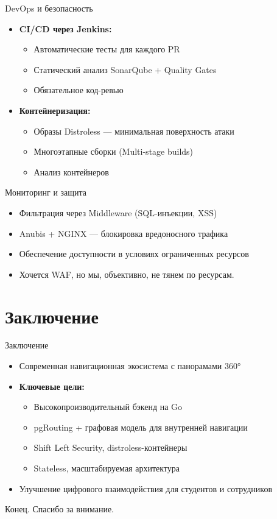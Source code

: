 \documentclass[10pt, aspectratio=169]{beamer}
\begin{document}
\begin{frame}{DevOps и безопасность}
	\begin{itemize}
		\item \textbf{CI/CD через Jenkins:}
		      \begin{itemize}
			      \item Автоматические тесты для каждого PR
			      \item Статический анализ SonarQube + Quality Gates
			      \item Обязательное код-ревью
		      \end{itemize}
		\item \textbf{Контейнеризация:}
		      \begin{itemize}
			      \item Образы Distroless --- минимальная поверхность атаки
			      \item Многоэтапные сборки (Multi-stage builds)
			      \item Анализ контейнеров
		      \end{itemize}
	\end{itemize}
\end{frame}

\begin{frame}{Мониторинг и защита}
	\begin{itemize}
		\item Фильтрация через Middleware (SQL-инъекции, XSS)
		\item Anubis + NGINX --- блокировка вредоносного трафика
		\item Обеспечение доступности в условиях ограниченных ресурсов
		\item Хочется WAF, но мы, объективно, не тянем по ресурсам.
	\end{itemize}
\end{frame}

\section*{Заключение}

\begin{frame}{Заключение}
	\begin{itemize}
		\item Современная навигационная экосистема с панорамами 360°
		\item \textbf{Ключевые цели:}
		      \begin{itemize}
			      \item Высокопроизводительный бэкенд на Go
			      \item pgRouting + графовая модель для внутренней навигации
			      \item Shift Left Security, distroless-контейнеры
			      \item Stateless, масштабируемая архитектура
		      \end{itemize}
		\item Улучшение цифрового взаимодействия для студентов и сотрудников
	\end{itemize}
\end{frame}

\begin{frame}{Конец.}
	\centering
	\vfill
	\Large{Спасибо за внимание.}
	\vfill
\end{frame}
\end{document}
